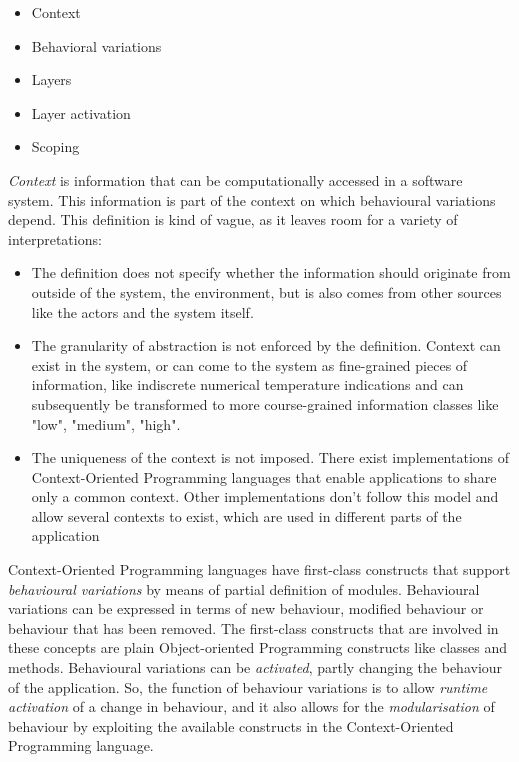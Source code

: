 \documentclass{acm_proc_article-sp}
\begin{document}
\begin{itemize}
\item {Context}
\item Behavioral variations
\item Layers
\item Layer activation
\item Scoping
\end{itemize}

\textit{Context} is information that can be computationally accessed in a software system. This information is part of the context on which behavioural variations depend. This definition is kind of vague, as it leaves room for a variety of interpretations: 
\begin{itemize}
\item The definition does not specify whether the information should originate from outside of the system, the environment, but is also comes from other sources like the actors and the system itself.
\item The granularity of abstraction is not enforced by the definition. Context can exist in the system, or can come to the system as fine-grained pieces of information, like indiscrete numerical temperature indications and can subsequently be transformed to more course-grained information classes like "low", "medium", "high". 
\item The uniqueness of the context is not imposed. There exist implementations of Context-Oriented Programming languages that enable applications to share only a common context. Other implementations don't follow this model and allow several contexts to exist, which are used in different parts of the application \cite{Appeltauer:2009:CCP:1562112.1562118}
\end{itemize}

Context-Oriented Programming languages have first-class constructs that support \textit{behavioural variations} by means of partial definition of modules. Behavioural variations can be expressed in terms of new behaviour, modified behaviour or behaviour that has been removed. The first-class constructs that are involved in these concepts are plain Object-oriented Programming constructs like classes and methods. Behavioural variations can be \textit{activated}, partly changing the behaviour of the application. So, the function of behaviour variations is to allow \textit{runtime activation} of a change in behaviour, and it also allows for the \textit{modularisation} of behaviour by exploiting the available constructs in the Context-Oriented Programming language.    
\end{document}
